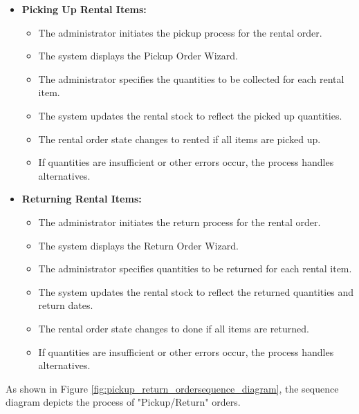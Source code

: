\begin{itemize}
    \item \textbf{Picking Up Rental Items:}
    \begin{itemize}
        \item The administrator initiates the pickup process for the rental order.
        \item The system displays the Pickup Order Wizard.
        \item The administrator specifies the quantities to be collected for each rental item.
        \item The system updates the rental stock to reflect the picked up quantities.
        \item The rental order state changes to rented if all items are picked up.
        \item If quantities are insufficient or other errors occur, the process handles alternatives.
    \end{itemize}
    \item \textbf{Returning Rental Items:}
    \begin{itemize}
        \item The administrator initiates the return process for the rental order.
        \item The system displays the Return Order Wizard.
        \item The administrator specifies quantities to be returned for each rental item.
        \item The system updates the rental stock to reflect the returned quantities and return dates.
        \item The rental order state changes to done if all items are returned.
        \item If quantities are insufficient or other errors occur, the process handles alternatives.
    \end{itemize}
\end{itemize}
\newpage
As shown in Figure \ref{fig:pickup_return_ordersequence_diagram}, the sequence diagram depicts the process of "Pickup/Return" orders.


